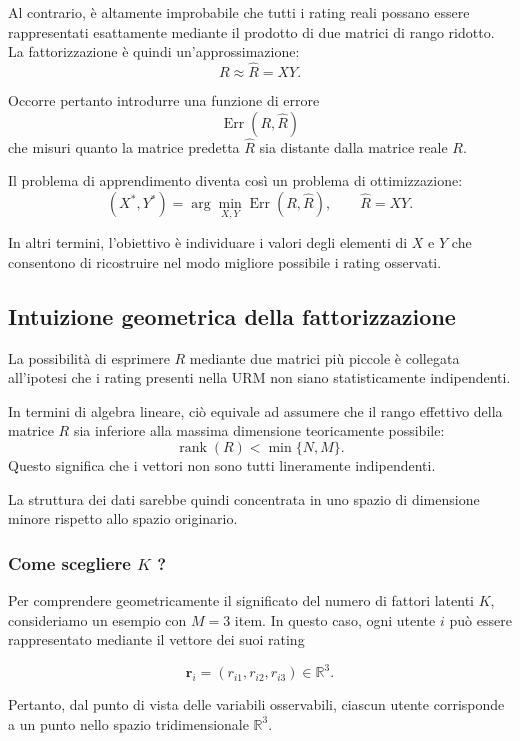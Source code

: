 Al contrario, è altamente improbabile che tutti i rating reali possano essere rappresentati esattamente mediante il prodotto di due matrici di rango ridotto. La fattorizzazione è quindi un'approssimazione:
\[
R \approx \widehat R = XY.
\]

Occorre pertanto introdurre una funzione di errore
\[
\operatorname{Err}(R,\widehat R)
\]
che misuri quanto la matrice predetta $\widehat R$ sia distante dalla matrice reale $R$.

Il problema di apprendimento diventa così un problema di ottimizzazione:
\begin{equation*}
(X^{*},Y^{*})
=
\arg\min_{X,Y}
\operatorname{Err}(R,\widehat R),
\qquad
\widehat R=XY.
\end{equation*}

In altri termini, l'obiettivo è individuare i valori degli elementi di $X$ e $Y$ che consentono di ricostruire nel modo migliore possibile i rating osservati.

\subsection{Intuizione geometrica della fattorizzazione}

La possibilità di esprimere $R$ mediante due matrici più piccole è collegata all'ipotesi che i rating presenti nella URM non siano statisticamente indipendenti.

In termini di algebra lineare, ciò equivale ad assumere che il rango effettivo della matrice $R$ sia inferiore alla massima dimensione teoricamente possibile:
\[
\operatorname{rank}(R)
<
\min\{N,M\}.
\]
Questo significa che i vettori non sono tutti lineramente indipendenti.

La struttura dei dati sarebbe quindi concentrata in uno spazio di dimensione minore rispetto allo spazio originario.
\subsubsection{Come scegliere $K$ ?}

Per comprendere geometricamente il significato del numero di fattori latenti \(K\), consideriamo un esempio con \(M=3\) item. In questo caso, ogni utente \(i\) può essere rappresentato mediante il vettore dei suoi rating

\[
\mathbf{r}_i =
(r_{i1},r_{i2},r_{i3})
\in \mathbb{R}^{3}.
\]

Pertanto, dal punto di vista delle variabili osservabili, ciascun utente corrisponde a un punto nello spazio tridimensionale \(\mathbb{R}^{3}\).

